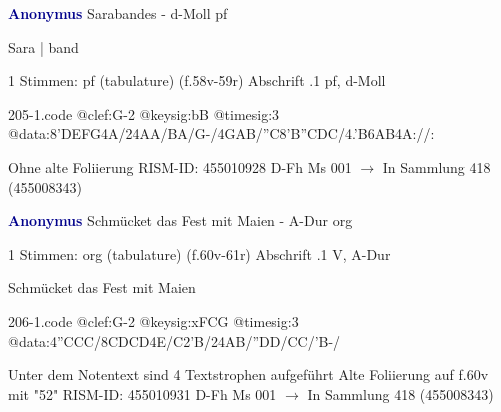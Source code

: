 \documentclass[twocolumn]{book}
\begin{document}
\newline \par \vspace{7pt} \textcolor{darkblue}{\textbf{Anonymus  }}
\newline Sarabandes - d-Moll
\newline pf
\newline \begin{itshape}[f.58v, at left:] Sara | band\end{itshape} 
\newline \textcolor{darkblue}{}  1 Stimmen: pf (tabulature)  (f.58v-59r)
\newline Abschrift
.1  pf, d-Moll  
\begin{filecontents*}{205-1.code}
@clef:G-2
@keysig:bB
@timesig:3
@data:{8'DEFG}4A/24AA/BA/G-/4GAB/''C{8'B''CDC}/4.'B{6AB}4A://:
\end{filecontents*}
\newline
%
\newline Ohne alte Foliierung
\newline RISM-ID: 455010928
\newline D-Fh  Ms 001
\newline $\rightarrow$ In Sammlung 418 (455008343)
      
\newline \par \vspace{7pt} \textcolor{darkblue}{\textbf{Anonymus  }}
\newline Schmücket das Fest mit Maien - A-Dur
\newline org
\newline \begin{itshape}\end{itshape} 
\newline \textcolor{darkblue}{}  1 Stimmen: org (tabulature)  (f.60v-61r)
\newline Abschrift
.1  V, A-Dur
\newline \begin{footnotesize} Schmücket das Fest mit Maien \end{footnotesize}  
\begin{filecontents*}{206-1.code}
@clef:G-2
@keysig:xFCG
@timesig:3
@data:4''CCC/{8CDCD}4E/C2'B/24AB/''DD/CC/'B-/
\end{filecontents*}
\newline
%
\newline Unter dem Notentext sind 4 Textstrophen aufgeführt
\newline Alte Foliierung auf f.60v mit "52"
\newline RISM-ID: 455010931
\newline D-Fh  Ms 001
\newline $\rightarrow$ In Sammlung 418 (455008343)
      
\end{document}
